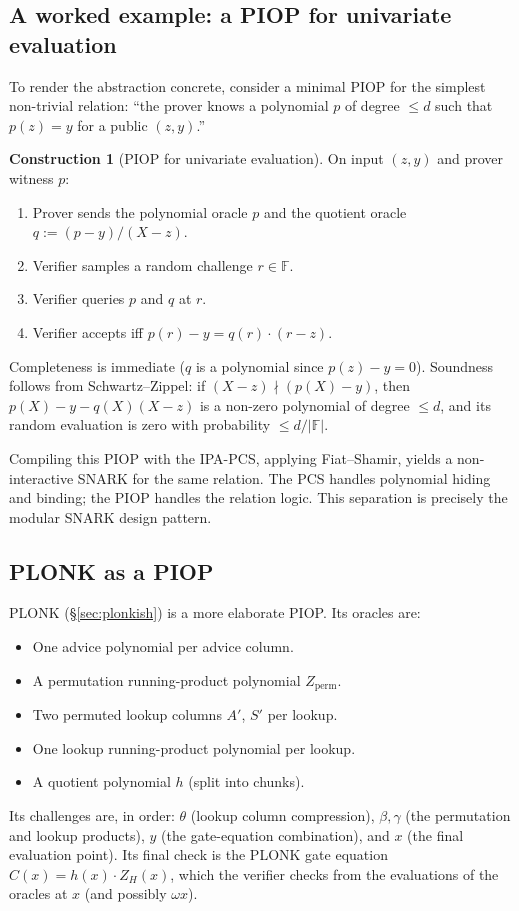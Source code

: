 \documentclass[11pt,a4paper]{article}
\theoremstyle{definition}
\newtheorem{construction}[theorem]{Construction}
\newcommand{\F}{\mathbb{F}}
\begin{document}
\subsection{A worked example: a PIOP for univariate evaluation}\label{ex:univariate-piop}

To render the abstraction concrete, consider a minimal PIOP for the simplest
non-trivial relation: ``the prover knows a polynomial $p$ of degree $\le d$
such that $p(z) = y$ for a public $(z, y)$.''

\begin{construction}[PIOP for univariate evaluation]\label{const:univ-piop}
On input $(z, y)$ and prover witness $p$:
\begin{enumerate}[leftmargin=*]
\item Prover sends the polynomial oracle $p$ and the quotient oracle
$q := (p - y)/(X - z)$.
\item Verifier samples a random challenge $r \in \F$.
\item Verifier queries $p$ and $q$ at $r$.
\item Verifier accepts iff $p(r) - y = q(r) \cdot (r - z)$.
\end{enumerate}
\end{construction}

Completeness is immediate ($q$ is a polynomial since $p(z) - y = 0$).
Soundness follows from Schwartz--Zippel: if $(X - z) \nmid (p(X) - y)$,
then $p(X) - y - q(X)(X - z)$ is a non-zero polynomial of degree $\le d$,
and its random evaluation is zero with probability $\le d/|\F|$.

Compiling this PIOP with the IPA-PCS, applying Fiat--Shamir, yields a
non-interactive SNARK for the same relation. The PCS handles polynomial
hiding and binding; the PIOP handles the relation logic. This separation
is precisely the modular SNARK design pattern.

\subsection{PLONK as a PIOP}

PLONK (\S\ref{sec:plonkish}) is a more elaborate PIOP. Its
oracles are:
\begin{itemize}[leftmargin=*]
\item One advice polynomial per advice column.
\item A permutation running-product polynomial $Z_{\mathrm{perm}}$.
\item Two permuted lookup columns \(A'\), \(S'\) per lookup.
\item One lookup running-product polynomial per lookup.
\item A quotient polynomial $h$ (split into chunks).
\end{itemize}
Its challenges are, in order: $\theta$ (lookup column compression),
$\beta, \gamma$ (the permutation and lookup products), $y$ (the
gate-equation combination), and $x$ (the final evaluation point). Its final check is the
PLONK gate equation $C(x) = h(x) \cdot Z_H(x)$, which the verifier checks from
the evaluations of the oracles at $x$ (and possibly $\omega x$).
\end{document}
